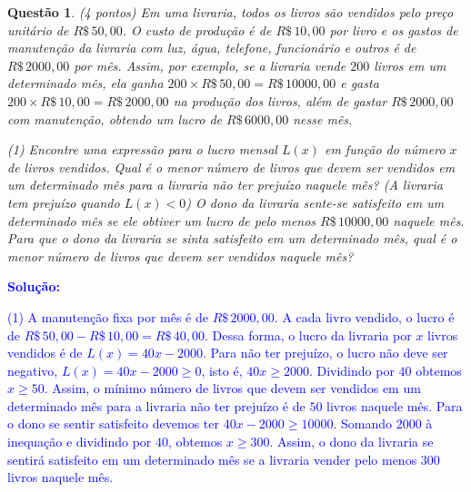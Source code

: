\documentclass[oneside,a4paper,12pt]{article}
\newcommand{\negrito}[1]{\mbox{\boldmath{$#1$}}}
\theoremstyle{Colorido}
\theoremstyle{solu}
\theoremstyle{dotlessP}
\newcommand{\solucao}[1]{\textcolor{blue}{\textbf{Solução:} #1}}
\newtheorem{sol}{Questão}
\begin{document}
\newpage
	\begin{sol}
\textit{(4 pontos)} \newline \newline
Em uma livraria, todos os livros são vendidos pelo preço unitário de $R\$\, 50,00$. O custo de produção é de $ R\$\, 10,00$ por livro e os gastos de manutenção da livraria com luz, água, telefone, funcionário e outros é de $R\$\, 2000,00$ por mês. Assim, por exemplo, se a livraria vende $200$ livros em um determinado mês, ela ganha $200 \times R\$\, 50,00=R\$\,10000,00$ e gasta $200 \times R\$\,10,00 = R\$\, 2000,00$ na produção dos livros, além de gastar $R\$\, 2000,00$ com manutenção, obtendo um lucro de $R\$\, 6000,00$ nesse mês.

\begin{tasks}[counter-format={(tsk[a])},label-width=3.6ex, label-format = {\bfseries}, column-sep = {20pt}](1)
\task[\textcolor{blue}{$\negrito{(a)} $}] Encontre uma expressão para o lucro mensal $L(x)$ em função do número $x$ de livros vendidos.
\task[\textcolor{blue}{$\negrito{(b)} $}] Qual é o menor  número de livros que devem ser vendidos em um determinado mês para a livraria não ter prejuízo naquele mês? (A livraria tem prejuízo quando $L(x)<0$)
\task[\textcolor{blue}{$\negrito{(c)} $}] O dono da livraria sente-se satisfeito em um determinado mês se ele obtiver um lucro de pelo menos $R\$\, 10000,00$ naquele mês. Para que o dono da livraria se sinta satisfeito em um determinado mês, qual é o menor número de livros que devem ser vendidos naquele mês?
\end{tasks}
\end{sol}
\solucao{\begin{tasks}[counter-format={(tsk[a])},label-width=3.6ex, label-format = {\bfseries}, column-sep = {20pt}](1)
\task[\textcolor{blue}{$\negrito{(a)} $}] A manutenção fixa por mês é de $R\$\, 2000,00$. A cada livro vendido, o lucro é de $R\$\, 50,00 - R\$\, 10,00 = R\$\, 40,00$. Dessa forma, o lucro da livraria por $x$ livros vendidos é de $L(x)=40x-2000$.
\task[\textcolor{blue}{$\negrito{(b)} $}] Para não ter prejuízo, o lucro não deve ser negativo, $L(x)=40x-2000 \geq 0$, isto é, $40x \geq 2000$. Dividindo por $40$ obtemos $x \geq 50$. Assim, o mínimo número de livros que devem ser vendidos em um determinado mês para a livraria não ter prejuízo é de $50$ livros naquele mês.
\task[\textcolor{blue}{$\negrito{(c)} $}] Para o dono se sentir satisfeito devemos ter $40x-2000 \geq 10000$. Somando $2000$ à inequação e dividindo por $40$, obtemos $x \geq 300$. Assim, o dono da livraria se sentirá satisfeito em um determinado mês se a livraria vender pelo menos $300$ livros naquele mês.
\end{tasks}}
\end{document}
